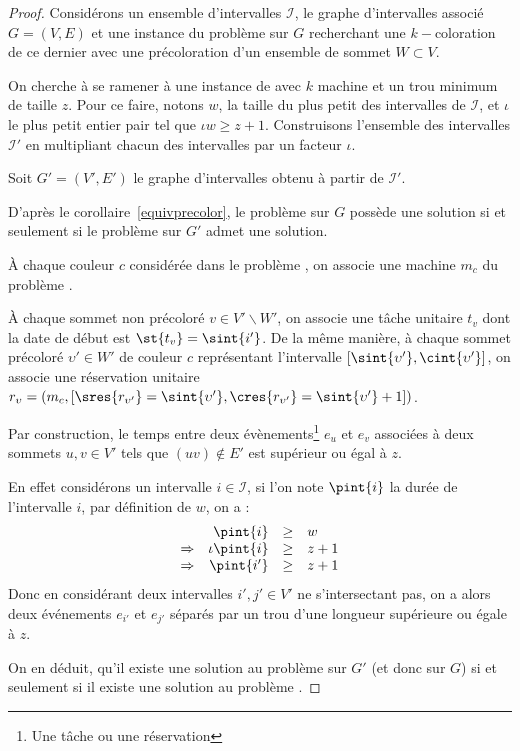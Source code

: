\begin{proof}
    Considérons un ensemble d'intervalles $\mathcal{I}$, le graphe d'intervalles associé
    $G=(V,E)$ et  une instance du problème \precolor sur $G$ recherchant une $k-$coloration de ce
    dernier avec une précoloration d'un ensemble de sommet $W \subset V$.
    
    On cherche à se ramener à une instance de \unitfischedpi avec $k$ machine et un trou minimum de
    taille $z$. Pour ce faire, notons $w$, la taille du plus petit des intervalles de $\mathcal{I}$,
    et $\iota$ le plus petit entier pair tel que $\iota w \geq z + 1$. Construisons l'ensemble des
    intervalles $\mathcal{I}'$ en multipliant chacun des intervalles par un facteur $\iota$.

    Soit $G'=(V',E')$ le graphe d'intervalles obtenu à partir de $\mathcal{I}'$.

    D'après le corollaire~\ref{equivprecolor}, le problème \precolor sur $G$ possède une solution si
    et seulement si le problème \precolor sur $G'$ admet une solution.

    À chaque couleur $c$ considérée dans le problème \precolor, on associe une machine $m_c$ du
    problème \unitfischedpi.

    À chaque sommet non précoloré $v \in V'\backslash W'$, on associe une tâche unitaire $t_v$ dont
    la date de début est $\st{t_v} = \sint{i'}$. 
    De la même manière, à chaque sommet précoloré $\upsilon' \in W'$ de couleur $c$ représentant
    l'intervalle $[\sint{\upsilon'}, \cint{\upsilon'}]$, on associe une réservation unitaire
    $r_{\upsilon} = (m_c, [\sres{r_{\upsilon'}} = \sint{\upsilon'}, \cres{r_{\upsilon'}} =
    \sint{\upsilon'} + 1])$.

    Par construction, le temps entre deux évènements\footnote{Une tâche ou une réservation} $e_u$ et
    $e_v$ associées à deux sommets $u, v \in V'$ tels que $(uv) \not \in E'$ est supérieur ou égal à
    $z$.

    En effet considérons un intervalle $i \in \mathcal{I}$, si l'on note $\pint{i}$ la durée de
    l'intervalle $i$, par définition de $w$, on a : 
    \[
        \begin{array}{rrcl}
             & \pint{i} & \geq & w \\
            \Rightarrow & \iota \pint{i} & \geq & z+1 \\
            \Rightarrow & \pint{i'} & \geq & z+1 \\
        \end{array}
    \]
    Donc en considérant deux intervalles $i', j' \in V'$ ne s'intersectant pas, on a alors deux
    événements $e_{i'}$ et $e_{j'}$ séparés par un trou d'une longueur supérieure ou égale à $z$.
    
    On en déduit, qu'il existe une solution au problème \precolor sur $G'$ (et donc sur $G$) si et
    seulement si il existe une solution au problème \unitfischedpi.
\end{proof}

